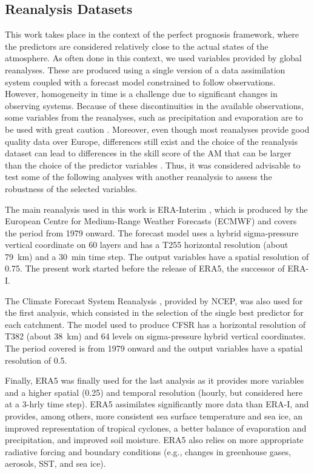 \documentclass[draft]{agujournal2019}
\begin{document}
\subsection{Reanalysis Datasets}
\label{reanalyses}

This work takes place in the context of the perfect prognosis framework, where the predictors are considered relatively close to the actual states of the atmosphere. As often done in this context, we used variables provided by global reanalyses. These are produced using a single version of a data assimilation system coupled with a forecast model constrained to follow observations. However, homogeneity in time is a challenge due to significant changes in observing systems. Because of these discontinuities in the available observations, some variables from the reanalyses, such as precipitation and evaporation are to be used with great caution \cite{Kobayashi2015}. Moreover, even though most reanalyses provide good quality data over Europe, differences still exist and the choice of the reanalysis dataset can lead to differences in the skill score of the AM that can be larger than the choice of the predictor variables \cite{Horton2018b}. Thus, it was considered advisable to test some of the following analyses with another reanalysis to assess the robustness of the selected variables.

The main reanalysis used in this work is ERA-Interim \cite<ERA-I,>{Dee2011a}, which is produced by the European Centre for Medium-Range Weather Forecasts (ECMWF) and covers the period from 1979 onward. The forecast model uses a hybrid sigma-pressure vertical coordinate on 60 layers and has a T255 horizontal resolution (about 79~km) and a 30~min time step. The output variables have a spatial resolution of 0.75\degree. The present work started before the release of ERA5, the successor of ERA-I.

The Climate Forecast System Reanalysis \cite<CFSR,>{Saha2010a}, provided by NCEP, was also used for the first analysis, which consisted in the selection of the single best predictor for each catchment. The model used to produce CFSR has a horizontal resolution of T382 (about 38~km) and 64 levels on sigma-pressure hybrid vertical coordinates. The period covered is from 1979 onward and the output variables have a spatial resolution of 0.5\degree.

Finally, ERA5 \cite{Hersbach2019} was finally used for the last analysis as it provides more variables and a higher spatial (0.25\degree) and temporal resolution (hourly, but considered here at a 3-hrly time step). ERA5 assimilates significantly more data than ERA-I, and provides, among others, more consistent sea surface temperature and sea ice, an improved representation of tropical cyclones, a better balance of evaporation and precipitation, and improved soil moisture. ERA5 also relies on more appropriate radiative forcing and boundary conditions (e.g., changes in greenhouse gases, aerosols, SST, and sea ice).
\end{document}
